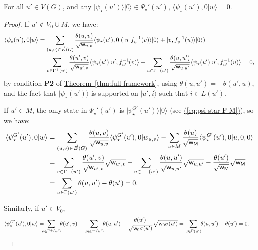\documentclass{article}
\newcommand{\eq}[1]{\hyperref[eq:#1]{(\ref*{eq:#1})}}
\newcommand{\thm}[1]{\hyperref[thm:#1]{Theorem~\ref*{thm:#1}}}
\def\ket#1{{\lvert}#1\rangle}
\def\bra#1{{\langle}#1\rvert}
\renewcommand{\>}{\rangle}
\newcommand{\<}{\langle}
\renewcommand{\(}{\left(}
\renewcommand{\)}{\right)}
\def\braket#1#2{{{\langle}#1\vert}#2\rangle}
\def\w{{\sf w}}
\begin{document}
\begin{claim}\label{clm:ortho2}
For all $u'\in V(G)$, and any $\ket{\psi_{\star}(u')}\ket{0}\in \Psi_{\star}'(u')$, $\braket{\psi_{\star}(u'),0}{w}=0$.
\end{claim}
\begin{proof}
If $u'\not\in V_0\cup M$, we have:
\begin{align*}
\braket{\psi_{\star}(u'),0}{w} &= \sum_{(u,v)\in\overrightarrow{E}(G)}\frac{\theta(u,v)}{\sqrt{\w_{u,v}}}\bra{\psi_{\star}(u'),0}(\ket{u,f_u^{-1}(v)}\ket{0}+\ket{v,f_v^{-1}(u)}\ket{0})\\
&= \sum_{v\in\Gamma^+(u')}\frac{\theta(u',v)}{\sqrt{\w_{u',v}}}\braket{\psi_\star(u')}{u',f_{u'}^{-1}(v)}
+\sum_{u\in\Gamma^-(u')}\frac{\theta(u,u')}{\sqrt{\w_{u,u'}}}\braket{\psi_\star(u')}{u',f_{u'}^{-1}(u)}=0,
\end{align*}
by condition \textbf{P2} of \thm{full-framework}, using $\theta(u,u')=-\theta(u',u)$, and the fact that $\ket{\psi_\star(u')}$ is supported on $\ket{u',i}$ such that $i\in L(u')$.

\noindent If $u'\in M$, the only state in $\Psi_{\star}'(u')$ is $\ket{\psi_{\star}^{G'}(u')}\ket{0}$ (see \eq{psi-star-F-M}), so we have:
\begin{align*}
\braket{\psi_{\star}^{G'}(u'),0}{w} &= \sum_{(u,v)\in\overrightarrow{E}(G)}\frac{\theta(u,v)}{\sqrt{\w_{u,v}}}\braket{\psi_{\star}^{G'}(u'),0}{w_{u,v}}
-\sum_{u\in M}\frac{\theta(u)}{\sqrt{\w_{\sf M}}}\braket{\psi_{\star}^{G'}(u'),0}{u,0,0}\\
&= \sum_{v\in\Gamma^+(u')}\frac{\theta(u',v)}{\sqrt{\w_{u',v}}}\sqrt{\w_{u',v}}
-\sum_{u\in\Gamma^-(u')}\frac{\theta(u,u')}{\sqrt{\w_{u,u'}}}\sqrt{\w_{u,u'}}-\frac{\theta(u')}{\sqrt{\w_{\sf M}}}\sqrt{\w_{\sf M}}\\
&= \sum_{u\in\Gamma(u')}\theta(u,u') - \theta(u') = 0.
\end{align*}

\noindent Similarly, if $u'\in V_0$, 
\begin{align*}
\braket{\psi_{\star}^{G'}(u'),0}{w} 
&= \!\!\!\!\sum_{v\in\Gamma^+(u')}\!\!\theta(u',v)
-\sum_{u\in\Gamma^-(u')}\!\!\theta(u,u')-\frac{\theta(u')}{\sqrt{\w_0\sigma(u')}}\sqrt{\w_0\sigma(u')}
= \sum_{u\in\Gamma(u')}\!\!\theta(u,u') - \theta(u') = 0.\qedhere
\end{align*}
\end{proof}
\end{document}

